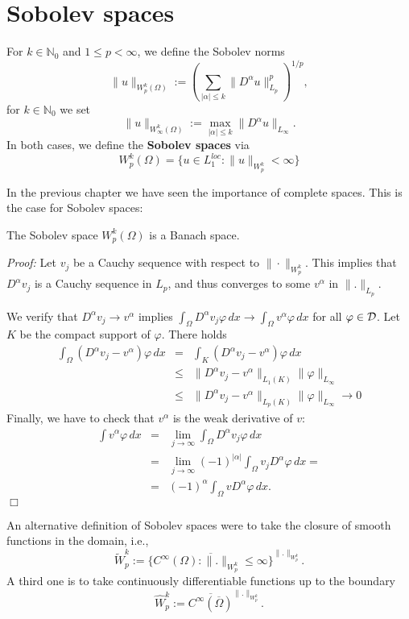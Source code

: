 \section{Sobolev spaces}

For $k \in {\mathbb N}_0$ and $1 \leq p < \infty$, we define the Sobolev norms 
$$
\| u \|_{W_p^k(\Omega)} := \left( \sum_{|\alpha| \leq k} \| D^\alpha u \|_{L_p}^p \right)^{1/p},
$$
for $k \in {\mathbb N}_0$ we set
$$
\| u \|_{W_\infty^k(\Omega)} := \max_{|\alpha| \leq k}  \| D^\alpha u \|_{L_\infty}.
$$
In both cases, we define the {\bf Sobolev spaces} via
$$
W_p^k(\Omega) = \{ u \in L_1^{loc} : \| u \|_{W_p^k} < \infty \}
$$

In the previous chapter we have seen the importance of complete spaces.
This is the case for Sobolev spaces:
\begin{theorem} The Sobolev space $W_p^k(\Omega)$ is a Banach space.
\end{theorem}
\noindent
{\em Proof:} Let $v_j$ be a Cauchy sequence with respect to $\| \cdot \|_{W_p^k}$. This implies that $D^\alpha v_j$ is a Cauchy sequence in $L_p$, and 
thus converges to some $v^\alpha$ in $\|. \|_{L_p}$. 

We verify that $D^\alpha v_j \rightarrow v^\alpha$ implies 
$\int_\Omega D^\alpha v_j \varphi \, dx \rightarrow \int_\Omega v^\alpha \varphi \, dx$ for all $\varphi \in {\cal D}$. Let $K$ be the compact support 
of $\varphi$. There holds 
\begin{eqnarray*}
\int_\Omega (D^\alpha v_j - v^\alpha) \varphi \, dx & = & 
\int_{K} (D^\alpha v_j - v^\alpha) \varphi \, dx  \\
& \leq & \| D^\alpha v_j - v^\alpha \|_{L_1(K)} \| \varphi \|_{L_\infty} \\
& \leq & \| D^\alpha v_j - v^\alpha \|_{L_p(K)} \| \varphi \|_{L_\infty}
\rightarrow 0
\end{eqnarray*}
Finally, we have to check that $v^\alpha$ is the weak derivative of $v$:
\begin{eqnarray*}
\int v^\alpha \varphi \, dx & = & 
        \lim_{j\rightarrow \infty} \int_\Omega D^\alpha v_j \varphi \, dx \\
        & = & \lim_{j\rightarrow \infty} (-1)^{|\alpha|} \int_\Omega v_j D^\alpha \varphi \, dx = \\
        & = & (-1)^\alpha \int_\Omega v  D^\alpha \varphi \, dx.
\end{eqnarray*}
\hfill $\Box$

\bigskip

An alternative definition of Sobolev spaces were to take the closure
of smooth functions in the domain, i.e.,
$$
\widetilde W_p^k := \overline{ \{ C^\infty (\Omega) : \|.\|_{W_p^k} \leq \infty \} }^{\|.\|_{W_p^k}}.
$$
A third one is to take continuously differentiable functions up to the boundary
$$
\widehat W_p^k := \overline{ C^\infty (\overline{\Omega}) }^{\|.\|_{W_p^k}}.
$$

